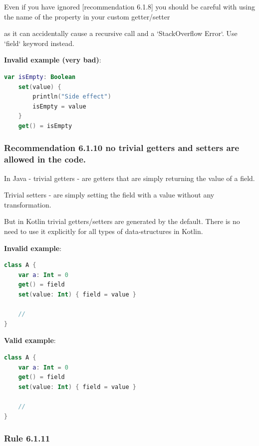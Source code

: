 {{{{Even if you have ignored [recommendation 6.1.8] you should be careful with using the name of the property in your custom getter/setter

as it can accidentally cause a recursive call and a `StackOverflow Error`. Use `field` keyword instead.



\textbf{Invalid example (very bad)}:

\begin{lstlisting}[language=Kotlin]
var isEmpty: Boolean
    set(value) {
        println("Side effect")
        isEmpty = value
    }
    get() = isEmpty
\end{lstlisting}


\subsubsection*{\textbf{Recommendation 6.1.10 no trivial getters and setters are allowed in the code.}}
\leavevmode\newline

In Java - trivial getters - are getters that are simply returning the value of a field.

Trivial setters - are simply setting the field with a value without any transformation.

But in Kotlin trivial getters/setters are generated by the default. There is no need to use it explicitly for all types of data-structures in Kotlin.



\textbf{Invalid example}:

\begin{lstlisting}[language=Kotlin]
class A {
    var a: Int = 0
    get() = field
    set(value: Int) { field = value }

    //
}
\end{lstlisting}


\textbf{Valid example}:

\begin{lstlisting}[language=Kotlin]
class A {
    var a: Int = 0
    get() = field
    set(value: Int) { field = value }

    //
}
\end{lstlisting}


\subsubsection*{\textbf{Rule 6.1.11}}
\leavevmode\newline

}}}}
